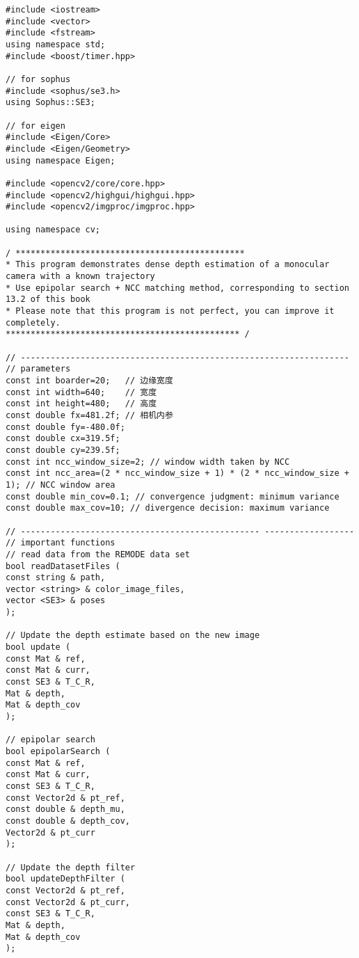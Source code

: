 \begin{lstlisting}[language=c ++, caption=slambook/ch13/dense \_monocular/dense \_mapping.cpp (fragment)]
#include <iostream>
#include <vector>
#include <fstream>
using namespace std; 
#include <boost/timer.hpp>

// for sophus 
#include <sophus/se3.h>
using Sophus::SE3;

// for eigen 
#include <Eigen/Core>
#include <Eigen/Geometry>
using namespace Eigen;

#include <opencv2/core/core.hpp>
#include <opencv2/highgui/highgui.hpp>
#include <opencv2/imgproc/imgproc.hpp>

using namespace cv;

/ **********************************************
* This program demonstrates dense depth estimation of a monocular camera with a known trajectory
* Use epipolar search + NCC matching method, corresponding to section 13.2 of this book
* Please note that this program is not perfect, you can improve it completely.
*********************************************** /

// ------------------------------------------------------------------
// parameters 
const int boarder=20; 	// 边缘宽度
const int width=640;  	// 宽度
const int height=480;  	// 高度
const double fx=481.2f;	// 相机内参
const double fy=-480.0f;
const double cx=319.5f;
const double cy=239.5f;
const int ncc_window_size=2; // window width taken by NCC
const int ncc_area=(2 * ncc_window_size + 1) * (2 * ncc_window_size + 1); // NCC window area
const double min_cov=0.1; // convergence judgment: minimum variance
const double max_cov=10; // divergence decision: maximum variance

// ------------------------------------------------ ------------------
// important functions
// read data from the REMODE data set
bool readDatasetFiles (
const string & path,
vector <string> & color_image_files,
vector <SE3> & poses
);

// Update the depth estimate based on the new image
bool update (
const Mat & ref,
const Mat & curr,
const SE3 & T_C_R,
Mat & depth,
Mat & depth_cov
);

// epipolar search
bool epipolarSearch (
const Mat & ref,
const Mat & curr,
const SE3 & T_C_R,
const Vector2d & pt_ref,
const double & depth_mu,
const double & depth_cov,
Vector2d & pt_curr
);

// Update the depth filter
bool updateDepthFilter (
const Vector2d & pt_ref,
const Vector2d & pt_curr,
const SE3 & T_C_R,
Mat & depth,
Mat & depth_cov
);


\end{lstlisting}
